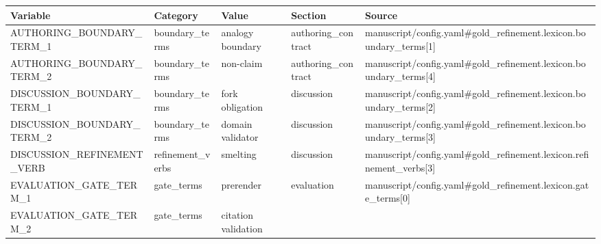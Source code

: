 \documentclass[
]{article}
\newcounter{none} %
\begin{document}
{\def\LTcaptype{none} %
\begin{longtable}[]{@{}
  >{\raggedright\arraybackslash}p{}
  >{\raggedright\arraybackslash}p{}
  >{\raggedright\arraybackslash}p{}
  >{\raggedright\arraybackslash}p{}
  >{\raggedright\arraybackslash}p{}@{}}
\toprule\noalign{}
\begin{minipage}[b]{\linewidth}\raggedright
Variable
\end{minipage} & \begin{minipage}[b]{\linewidth}\raggedright
Category
\end{minipage} & \begin{minipage}[b]{\linewidth}\raggedright
Value
\end{minipage} & \begin{minipage}[b]{\linewidth}\raggedright
Section
\end{minipage} & \begin{minipage}[b]{\linewidth}\raggedright
Source
\end{minipage} \\
\midrule\noalign{}
\endhead
\bottomrule\noalign{}
\endlastfoot
AUTHORING\_BOUNDARY\_TERM\_1 & boundary\_terms & analogy boundary &
authoring\_contract &
manuscript/config.yaml\#gold\_refinement.lexicon.boundary\_terms{[}1{]} \\
AUTHORING\_BOUNDARY\_TERM\_2 & boundary\_terms & non-claim &
authoring\_contract &
manuscript/config.yaml\#gold\_refinement.lexicon.boundary\_terms{[}4{]} \\
DISCUSSION\_BOUNDARY\_TERM\_1 & boundary\_terms & fork obligation &
discussion &
manuscript/config.yaml\#gold\_refinement.lexicon.boundary\_terms{[}2{]} \\
DISCUSSION\_BOUNDARY\_TERM\_2 & boundary\_terms & domain validator &
discussion &
manuscript/config.yaml\#gold\_refinement.lexicon.boundary\_terms{[}3{]} \\
DISCUSSION\_REFINEMENT\_VERB & refinement\_verbs & smelting & discussion
&
manuscript/config.yaml\#gold\_refinement.lexicon.refinement\_verbs{[}3{]} \\
EVALUATION\_GATE\_TERM\_1 & gate\_terms & prerender & evaluation &
manuscript/config.yaml\#gold\_refinement.lexicon.gate\_terms{[}0{]} \\
EVALUATION\_GATE\_TERM\_2 & gate\_terms & citation validation &

\end{longtable}}
\end{document}
